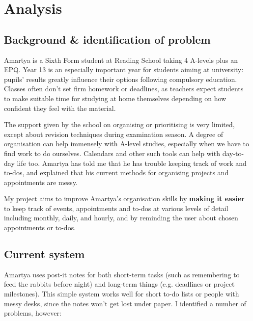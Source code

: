 \section{Analysis}

\subsection{Background \& identification of problem}

Amartya is a Sixth Form student at Reading School taking 4 A-levels plus an EPQ.
Year 13 is an especially important year for students aiming at university:
pupils' results greatly influence their options following compulsory education.
Classes often don't set firm homework or deadlines, as teachers expect students
to make suitable time for studying at home themselves depending on how confident
they feel with the material.

The support given by the school on organising or prioritising is very limited,
except about revision techniques during examination season. A degree of
organisation can help immensely with A-level studies, especially when we have to
find work to do ourselves. Calendars and other such tools can help with
day-to-day life too. Amartya has told me that he has trouble keeping track of
work and to-dos, and explained that his current methods for organising projects
and appointments are messy.

My project aims to improve Amartya's organisation skills by \textbf{making it
easier} to keep track of events, appointments and to-dos at various levels of
detail including monthly, daily, and hourly, and by reminding the user about
chosen appointments or to-dos.


\subsection{Current system}

Amartya uses post-it notes for both short-term tasks (such as remembering to
feed the rabbits before night) and long-term things (e.g. deadlines or project
milestones). This simple system works well for short to-do lists or people with
messy desks, since the notes won't get lost under paper. I identified a number
of problems, however:

